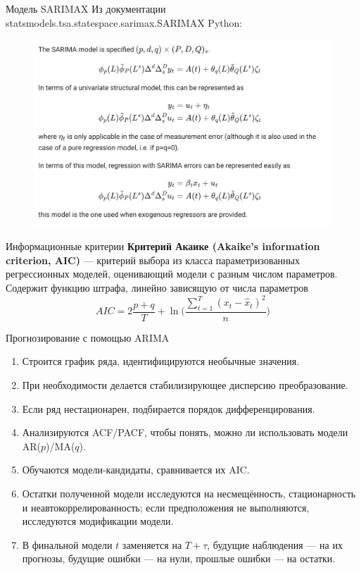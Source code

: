 \begin{frame}{Модель SARIMAX}
Из документации statsmodels.tsa.statespace.sarimax.SARIMAX Python:
\begin{figure}
    \centering
    \includegraphics[width=0.75\linewidth]{lecture_2/fig/sarimax_tsa.png}
\end{figure}
\end{frame}
\begin{frame}{Информационные критерии}
\textbf{Критерий Акаике (Akaike's information criterion, AIC)} --- критерий выбора из класса параметризованных регрессионных моделей, оценивающий модели с разным числом параметров.
Содержит функцию штрафа, линейно зависящую от числа параметров
\begin{equation*}
    AIC = 2\frac{p + q}{T} + \ln\Bigg(\frac{\sum_{t=1}^T (x_t - \hat{x}_t)^2}{n}\Bigg)
\end{equation*}

\end{frame}
\begin{frame}{Прогнозирование с помощью ARIMA}
\begin{enumerate}
    \item Строится график ряда, идентифицируются необычные значения.
    \item При необходимости делается стабилизирующее дисперсию
    преобразование.
    \item Если ряд нестационарен, подбирается порядок дифференцирования.
    \item Анализируются ACF/PACF, чтобы понять, можно ли использовать модели AR($p$)/MA($q$).
    \item Обучаются модели-кандидаты, сравнивается их AIC.
    \item Остатки полученной модели исследуются на несмещённость, стационарность и неавтокоррелированность; если предположения не выполняются, исследуются модификации модели.
    \item В финальной модели $t$ заменяется на $T + \tau$, будущие наблюдения — на их прогнозы, будущие ошибки — на нули, прошлые ошибки — на остатки.
\end{enumerate}
\end{frame}
